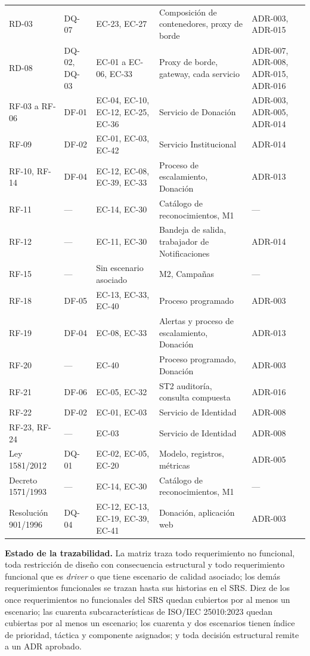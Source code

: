 \documentclass[11pt,a4paper]{article}
\begin{document}
\begin{longtable}{L{2.0cm} L{2.6cm} L{4.2cm} L{2.6cm} L{2.0cm}}
RD-03 & DQ-07 & EC-23, EC-27 & Composición de contenedores, proxy de borde & ADR-003, ADR-015 \\
RD-08 & DQ-02, DQ-03 & EC-01 a EC-06, EC-33 & Proxy de borde, gateway, cada servicio & ADR-007, ADR-008, ADR-015, ADR-016 \\
RF-03 a RF-06 & DF-01 & EC-04, EC-10, EC-12, EC-25, EC-36 & Servicio de Donación & ADR-003, ADR-005, ADR-014 \\
RF-09 & DF-02 & EC-01, EC-03, EC-42 & Servicio Institucional & ADR-014 \\
RF-10, RF-14 & DF-04 & EC-12, EC-08, EC-39, EC-33 & Proceso de escalamiento, Donación & ADR-013 \\
RF-11 & --- & EC-14, EC-30 & Catálogo de reconocimientos, M1 & --- \\
RF-12 & --- & EC-11, EC-30 & Bandeja de salida, trabajador de Notificaciones & ADR-014 \\
RF-15 & --- & Sin escenario asociado & M2, Campañas & --- \\
RF-18 & DF-05 & EC-13, EC-33, EC-40 & Proceso programado & ADR-003 \\
RF-19 & DF-04 & EC-08, EC-33 & Alertas y proceso de escalamiento, Donación & ADR-013 \\
RF-20 & --- & EC-40 & Proceso programado, Donación & ADR-003 \\
RF-21 & DF-06 & EC-05, EC-32 & ST2 auditoría, consulta compuesta & ADR-016 \\
RF-22 & DF-02 & EC-01, EC-03 & Servicio de Identidad & ADR-008 \\
RF-23, RF-24 & --- & EC-03 & Servicio de Identidad & ADR-008 \\
Ley 1581/2012 & DQ-01 & EC-02, EC-05, EC-20 & Modelo, registros, métricas & ADR-005 \\
Decreto 1571/1993 & --- & EC-14, EC-30 & Catálogo de reconocimientos, M1 & --- \\
Resolución 901/1996 & DQ-04 & EC-12, EC-13, EC-19, EC-39, EC-41 & Donación, aplicación web & ADR-003 \\
\end{longtable}

\noindent\textbf{Estado de la trazabilidad.} La matriz traza todo requerimiento no funcional, toda restricción de diseño con consecuencia estructural y todo requerimiento funcional que es \emph{driver} o que tiene escenario de calidad asociado; los demás requerimientos funcionales se trazan hasta sus historias en el SRS. Diez de los once requerimientos no funcionales del SRS quedan cubiertos por al menos un escenario; las cuarenta subcaracterísticas de ISO/IEC 25010:2023 quedan cubiertas por al menos un escenario; los cuarenta y dos escenarios tienen índice de prioridad, táctica y componente asignados; y toda decisión estructural remite a un ADR aprobado.
\end{document}
